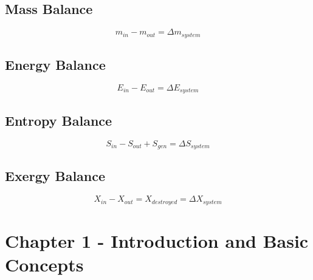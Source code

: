 \documentclass[10pt,landscape]{article}
\begin{document}
\begin{multicols}{3}
\subsection{Mass Balance}
\begin{equation}
    m_{in}-m_{out}=\Delta m_{system}
\end{equation}
\subsection{Energy Balance}
\begin{equation}
    E_{in}-E_{out}=\Delta E_{system}
\end{equation}
\subsection{Entropy Balance}
\begin{equation}
    S_{in}-S_{out}+S_{gen}=\Delta S_{system}
\end{equation}
\subsection{Exergy Balance}
\begin{equation}
    X_{in}-X_{out}=X_{destroyed}=\Delta X_{system}
\end{equation}

\section{Chapter 1 - Introduction and Basic Concepts}

\end{multicols}
\end{document}
